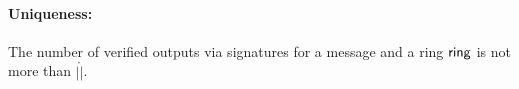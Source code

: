 %

\paragraph{Uniqueness:} The number of verified outputs via signatures for a message and a ring $ \mathsf{ring} $ is not more than $ |\ring| $.

